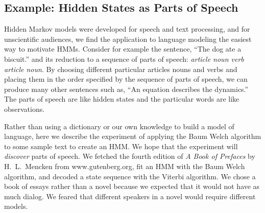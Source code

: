 \subsection{Example: Hidden States as Parts of Speech}
\label{sec:POSpeech}

Hidden Markov models were developed for speech and text processing,
and for unscientific audiences, we find the application to language
modeling the easiest way to motivate HMMs.  Consider for example the
sentence, ``The dog ate a biscuit.'' and its reduction to a sequence
of parts of speech: \emph{article noun verb article noun}.  By
choosing different particular articles nouns and verbs and placing
them in the order specified by the sequence of parts of speech, we can
produce many other sentences such as, ``An equation describes the
dynamics.''  The parts of speech are like hidden states and the
particular words are like observations.

Rather than using a dictionary or our own knowledge to build a model
of language, here we describe the experiment of applying the Baum
Welch algorithm to some sample text to create an HMM.  We hope that
the experiment will \emph{discover} parts of speech.  We fetched the
fourth edition of \emph{A Book of Prefaces} by H.~L.~Mencken from
www.gutenberg.org, fit an HMM with the Baum Welch algorithm, and
decoded a state sequence with the Viterbi algorithm.  We chose a book
of essays rather than a novel because we expected that it would not
have as much dialog.  We feared that different speakers in a novel
would require different models.

